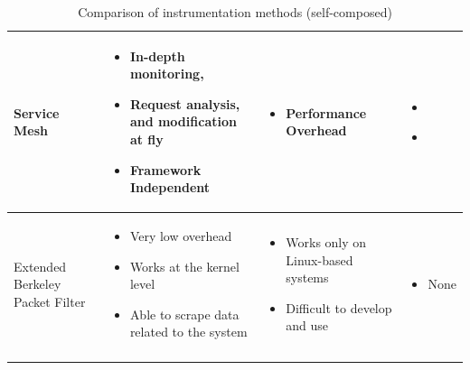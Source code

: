 \begin{longtable}{| p{23mm} | p{40mm} | p{40mm} | p{40mm} |}
    Service Mesh &
    \vspace{-8mm}
    \begin{itemize}[leftmargin=0mm,noitemsep,nolistsep,label={}] 
        \item In-depth monitoring,
        \item Request analysis, and modification at fly
        \item Framework Independent
        \vspace{-7mm}
    \end{itemize} &
    \vspace{-8mm}
    \begin{itemize}[leftmargin=0mm,noitemsep,nolistsep,label={}] 
        \item Performance Overhead
        \vspace{-7mm}
    \end{itemize} &
    \vspace{-8mm}
    \begin{itemize}[leftmargin=0mm,noitemsep,nolistsep,label={}] 
        \item \cite{samir2019dla}
        \item \cite{wu2020microrca}
        \vspace{-7mm}
    \end{itemize} \\ \hline
    
    Extended Berkeley Packet Filter &
    \vspace{-8mm}
    \begin{itemize}[leftmargin=0mm,noitemsep,nolistsep,label={}] 
        \item Very low overhead
        \item Works at the kernel level
        \item Able to scrape data related to the system
        \vspace{-7mm}
    \end{itemize} &
    \vspace{-8mm}
    \begin{itemize}[leftmargin=0mm,noitemsep,nolistsep,label={}] 
        \item Works only on Linux-based systems
        \item Difficult to develop and use
        \vspace{-7mm}
    \end{itemize} &
    \vspace{-8mm}
    \begin{itemize}[leftmargin=0mm,noitemsep,nolistsep,label={}] 
        \item None
        \vspace{-7mm}
    \end{itemize} \\ \hline

    \caption{Comparison of instrumentation methods (self-composed)}
\end{longtable}


